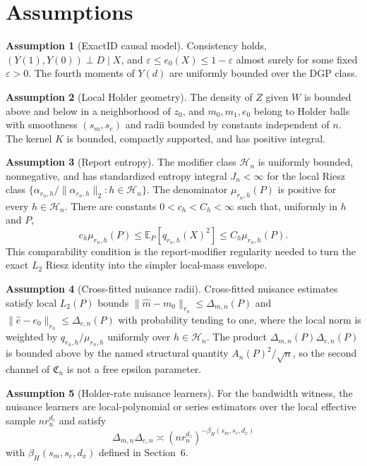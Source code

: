 \documentclass[11pt]{article}
\newcommand{\E}{\mathbb{E}}
\newcommand{\calH}{\mathcal{H}}
\theoremstyle{definition}
\newtheorem{assumption}{Assumption}
\theoremstyle{plain}
\theoremstyle{remark}
\begin{document}
\section{Assumptions}
\begin{assumption}[ExactID causal model]\label{ass:exactid}
Consistency holds, \((Y(1),Y(0))\perp D\mid X\), and
\(\varepsilon\le e_0(X)\le 1-\varepsilon\) almost surely for some fixed
\(\varepsilon>0\).  The fourth moments of \(Y(d)\) are uniformly bounded over
the DGP class.
\end{assumption}

\begin{assumption}[Local Holder geometry]\label{ass:holder}
The density of \(Z\) given \(W\) is bounded above and below in a neighborhood
of \(z_0\), and \(m_0,m_1,e_0\) belong to Holder balls with smoothness
\((s_m,s_e)\) and radii bounded by constants independent of \(n\).  The kernel
\(K\) is bounded, compactly supported, and has positive integral.
\end{assumption}

\begin{assumption}[Report entropy]\label{ass:entropy}
The modifier class \(\calH_n\) is uniformly bounded, nonnegative, and has
standardized entropy integral \(J_n<\infty\) for the local Riesz class
\(\{\alpha_{r_n,h}/\|\alpha_{r_n,h}\|_2:h\in\calH_n\}\).  The denominator
\(\mu_{r_n,h}(P)\) is positive for every \(h\in\calH_n\).  There are constants
\(0<c_h<C_h<\infty\) such that, uniformly in \(h\) and \(P\),
\[
c_h\mu_{r_n,h}(P)\le \E_P[q_{r_n,h}(X)^2]\le C_h\mu_{r_n,h}(P).
\]
This comparability condition is the report-modifier regularity needed to turn
the exact \(L_2\) Riesz identity into the simpler local-mass envelope.
\end{assumption}

\begin{assumption}[Cross-fitted nuisance radii]\label{ass:nuisance}
Cross-fitted nuisance estimates satisfy local \(L_2(P)\) bounds
\(\|\widehat m-m_0\|_{r_n}\le \Delta_{m,n}(P)\) and
\(\|\widehat e-e_0\|_{r_n}\le \Delta_{e,n}(P)\) with probability tending to
one, where the local norm is weighted by \(q_{r_n,h}/\mu_{r_n,h}\) uniformly
over \(h\in\calH_n\).  The product
\(\Delta_{m,n}(P)\Delta_{e,n}(P)\) is bounded above by the named structural
quantity \(A_n(P)^2/\sqrt n\), so the second channel of \(\mathfrak C_n\) is
not a free epsilon parameter.
\end{assumption}

\begin{assumption}[Holder-rate nuisance learners]\label{ass:holder-learners}
For the bandwidth witness, the nuisance learners are local-polynomial or
series estimators over the local effective sample \(nr_n^{d_z}\) and satisfy
\[
\Delta_{m,n}\Delta_{e,n}\asymp
(nr_n^{d_z})^{-\beta_H(s_m,s_e,d_x)}
\]
with \(\beta_H(s_m,s_e,d_x)\) defined in Section~6.
\end{assumption}
\end{document}
